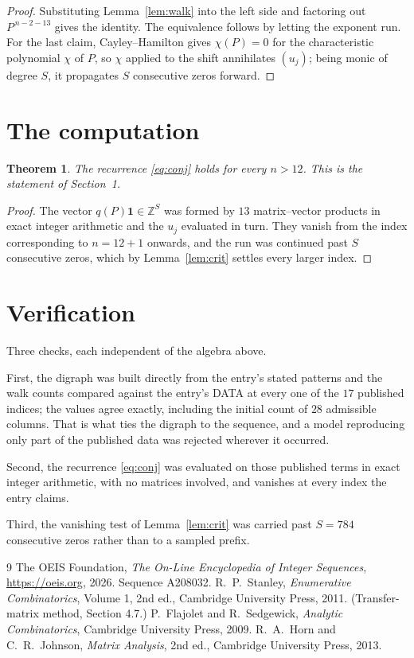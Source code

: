 \documentclass[11pt,a4paper]{article}
\theoremstyle{plain}
\newtheorem{theorem}{Theorem}
\theoremstyle{definition}
\begin{document}
\begin{proof}
Substituting Lemma~\ref{lem:walk} into the left side and factoring out
$P^{\,n-2-13}$ gives the identity. The equivalence follows by letting the exponent
run. For the last claim, Cayley--Hamilton gives $\chi(P)=0$ for the characteristic
polynomial $\chi$ of $P$, so $\chi$ applied to the shift annihilates $(u_j)$; being monic of
degree $S$, it propagates $S$ consecutive zeros forward.
\end{proof}

\section{The computation}

\begin{theorem}
The recurrence \eqref{eq:conj} holds for every $n>12$. This is the statement of
Section~1.
\end{theorem}

\begin{proof}
The vector $q(P)\mathbf{1}\in\mathbb{Z}^{S}$ was formed by $13$ matrix--vector
products in exact integer arithmetic and the $u_j$ evaluated in turn. They vanish from the
index corresponding to $n=12+1$ onwards, and the run was continued past $S$ consecutive
zeros, which by Lemma~\ref{lem:crit} settles every larger index.
\end{proof}

\section{Verification}

Three checks, each independent of the algebra above.

First, the digraph was built directly from the entry's stated patterns and the walk counts
compared against the entry's DATA at every one of the $17$ published indices; the
values agree exactly, including the initial count of $28$ admissible columns. That is
what ties the digraph to the sequence, and a model reproducing only part of the published
data was rejected wherever it occurred.

Second, the recurrence \eqref{eq:conj} was evaluated on those published terms in exact
integer arithmetic, with no matrices involved, and vanishes at every index the entry claims.

Third, the vanishing test of Lemma~\ref{lem:crit} was carried past $S=784$ consecutive
zeros rather than to a sampled prefix.

\begin{thebibliography}{9}
 The OEIS Foundation, \emph{The On-Line Encyclopedia of Integer
Sequences}, \url{https://oeis.org}, 2026. Sequence A208032.
 R.~P.~Stanley, \emph{Enumerative Combinatorics}, Volume 1, 2nd ed.,
Cambridge University Press, 2011. (Transfer-matrix method, Section 4.7.)
 P.~Flajolet and R.~Sedgewick, \emph{Analytic Combinatorics}, Cambridge
University Press, 2009.
 R.~A.~Horn and C.~R.~Johnson, \emph{Matrix Analysis}, 2nd ed., Cambridge
University Press, 2013.
\end{thebibliography}
\end{document}
